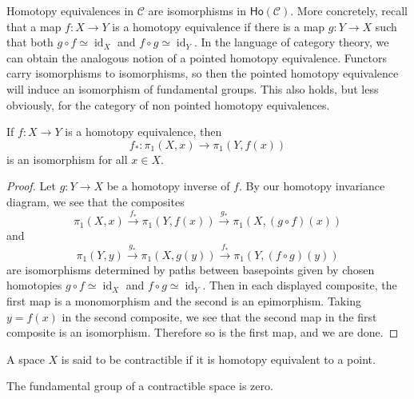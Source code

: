 Homotopy equivalences in $\mathcal{C} $ are isomorphisms in $\mathsf{Ho} (\mathcal{C} )$. More concretely, recall that a map $f \colon X \to Y$ is a homotopy equivalence if there is a map $g \colon Y \to X$ such that both $g\circ f \simeq \operatorname{id}_X$ and $f\circ g \simeq \operatorname{id}_Y$. In the language of category theory, we can obtain the analogous notion of a pointed homotopy equivalence. Functors carry isomorphisms to isomorphisms, so then the pointed homotopy equivalence will induce an isomorphism of fundamental groups. This also holds, but less obviously, for the category of non pointed homotopy equivalences.
\begin{theorem}
    If $f \colon X \to Y$ is a homotopy equivalence, then \[
        f_* \colon \pi_1(X,x) \to \pi_1(Y,f(x))
    \] is an isomorphism for all $x\in X$.
\end{theorem}
\begin{proof}
    Let $g \colon Y \to X$ be a homotopy inverse of $f$. By our homotopy invariance diagram, we see that the composites \[
        \pi_1(X,x)\overset{f_*}{\longrightarrow }\pi_1(Y,f(x))\overset{g_*}{\longrightarrow}\pi_1(X,(g\circ f)(x))
    \] and \[
    \pi_1(Y,y)\overset{g_*}{\longrightarrow}\pi_1(X,g(y))\overset{f_*}{\longrightarrow}\pi_1(Y,(f\circ g)(y))
\] are isomorphisms determined by paths between basepoints given by chosen homotopies $g\circ f \simeq \operatorname{id}_X$ and $f\circ g \simeq \operatorname{id}_Y$. Then in each displayed composite, the first map is a monomorphism and the second is an epimorphism. Taking $y=f(x)$ in the second composite, we see that the second map in the first composite is an isomorphism. Therefore so is the first map, and we are done.
\end{proof}
A space $X$ is said to be contractible if it is homotopy equivalent to a point.
\begin{cor}
    The fundamental group of a contractible space is zero.
\end{cor}

